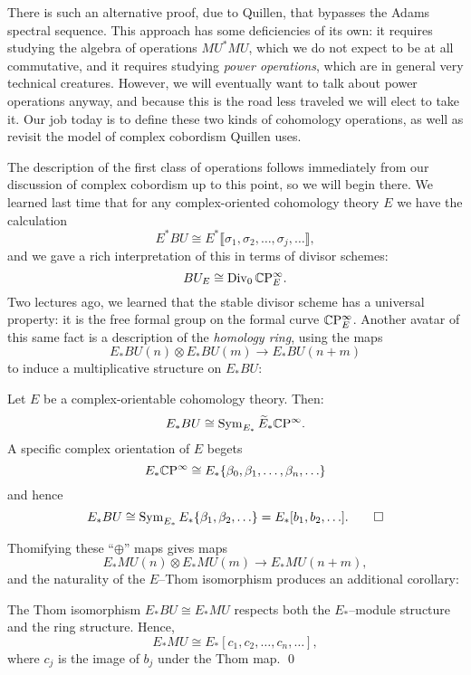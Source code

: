 There is such an alternative proof, due to Quillen, that bypasses the Adams spectral sequence.  This approach has some deficiencies of its own: it requires studying the algebra of operations $MU^* MU$, which we do not expect to be at all commutative, and it requires studying \textit{power operations}, which are in general very technical creatures.  However, we will eventually want to talk about power operations anyway, and because this is the road less traveled we will elect to take it.  Our job today is to define these two kinds of cohomology operations, as well as revisit the model of complex cobordism Quillen uses.

The description of the first class of operations follows immediately from our discussion of complex cobordism up to this point, so we will begin there.  We learned last time that for any complex-oriented cohomology theory $E$ we have the calculation \[E^* BU \cong E^*\llbracket \sigma_1, \sigma_2, \ldots, \sigma_j, \ldots\rrbracket,\] and we gave a rich interpretation of this in terms of divisor schemes: \[BU_E \cong \operatorname{Div}_0 \mathbb{C}\mathrm P^\infty_E.\]  Two lectures ago, we learned that the stable divisor scheme has a universal property: it is the free formal group on the formal curve $\mathbb{C}\mathrm P^\infty_E$.  Another avatar of this same fact is a description of the \emph{homology ring}, using the maps \[E_* BU(n) \otimes E_* BU(m) \to E_* BU(n+m)\] to induce a multiplicative structure on $E_* BU$:
\begin{corollary}
Let $E$ be a complex-orientable cohomology theory. Then: \[E_* BU \cong \operatorname{Sym}_{E_*} \widetilde E_* \mathbb{C}\mathrm P^\infty.\]  A specific complex orientation of $E$ begets \[E_* \mathbb{C}\mathrm P^\infty \cong E_*\{\beta_0, \beta_1, \ldots, \beta_n, \ldots\}\] and hence \[E_* BU \cong \operatorname{Sym}_{E_*} E_*\{\beta_1, \beta_2, \ldots\} = E_*[b_1, b_2, \ldots]. \qed\]
\end{corollary} 

Thomifying these ``$\oplus$'' maps gives maps \[E_* MU(n) \otimes E_* MU(m) \to E_* MU(n+m),\] and the naturality of the $E$--Thom isomorphism produces an additional corollary:
\begin{corollary}
The Thom isomorphism $E_* BU \cong E_* MU$ respects both the $E_*$--module structure and the ring structure.  Hence, \[E_* MU \cong E_*[c_1, c_2, \ldots, c_n, \ldots],\] where $c_j$ is the image of $b_j$ under the Thom map. \qed
\end{corollary}


